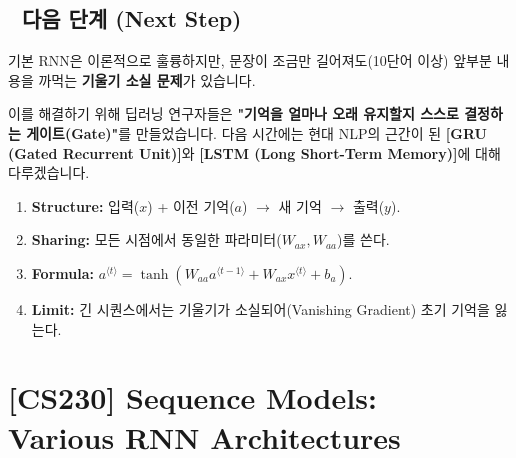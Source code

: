 \documentclass[11pt,a4paper]{book}
\theoremstyle{definition}
\begin{document}
\section*{🔗 다음 단계 (Next Step)}
기본 RNN은 이론적으로 훌륭하지만, 문장이 조금만 길어져도(10단어 이상) 앞부분 내용을 까먹는 \textbf{기울기 소실 문제}가 있습니다.

이를 해결하기 위해 딥러닝 연구자들은 \textbf{"기억을 얼마나 오래 유지할지 스스로 결정하는 게이트(Gate)"}를 만들었습니다.
다음 시간에는 현대 NLP의 근간이 된 \textbf{[GRU (Gated Recurrent Unit)]}와 \textbf{[LSTM (Long Short-Term Memory)]}에 대해 다루겠습니다.

\vspace{0.5cm}

\begin{summarybox}[title={단원 요약 (Cheat Sheet)}]
\begin{enumerate}
    \item \textbf{Structure:} 입력($x$) + 이전 기억($a$) $\rightarrow$ 새 기억 $\rightarrow$ 출력($y$).
    \item \textbf{Sharing:} 모든 시점에서 동일한 파라미터($W_{ax}, W_{aa}$)를 쓴다.
    \item \textbf{Formula:} $a^{\langle t \rangle} = \tanh(W_{aa}a^{\langle t-1 \rangle} + W_{ax}x^{\langle t \rangle} + b_a)$.
    \item \textbf{Limit:} 긴 시퀀스에서는 기울기가 소실되어(Vanishing Gradient) 초기 기억을 잃는다.
\end{enumerate}
\end{summarybox}


\chapter{[CS230] Sequence Models: \\ Various RNN Architectures}
\label{ch:lecture40}

\end{document}
